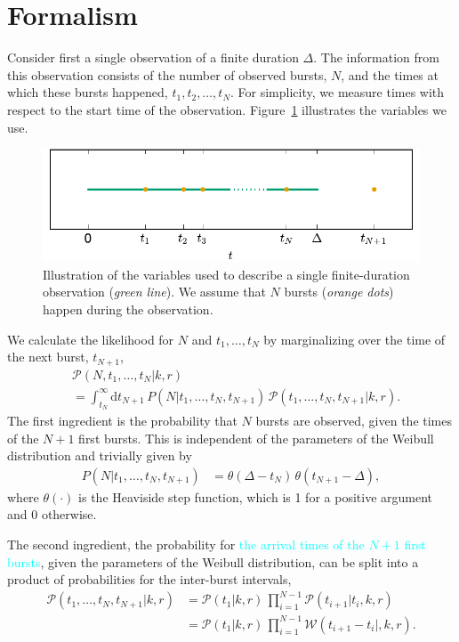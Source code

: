 \documentclass[fleqn,usenatbib]{mnras}
\newcommand{\new}[1]{\textcolor{cyan}{#1}}
\begin{document}
\section{Formalism}
\label{sec:formalism}

Consider first a single observation of a finite duration $\Delta$. The information from this observation consists of the number of observed bursts, $N$, and the times at which these bursts happened, $t_1, t_2,\dots, t_N$. For simplicity, we measure times with respect to the start time of the observation. Figure~\ref{fig:singleinterval} illustrates the variables we use.

\begin{figure}
	\includegraphics[width=\columnwidth]{singleinterval.pdf}
	\caption{\label{fig:singleinterval}Illustration of the variables used to describe a single finite-duration observation (\emph{green line}). We assume that $N$ bursts (\emph{orange dots}) happen during the observation.}
\end{figure}

We calculate the likelihood for $N$ and $t_1,\dots,t_N$ by marginalizing over the time of the next burst, $t_{N+1}$,
\begin{align}
	\label{eq:likelihood_firstsplit}
	&\mathcal{P}(N,t_1,\dots,t_N|k,r)\nonumber\\
	&= \int_{t_N}^\infty \mathrm{d}t_{N+1} \, P(N|t_1,\dots,t_N,t_{N+1}) \, \mathcal{P}(t_1,\dots,t_N,t_{N+1}|k,r).
\end{align}
The first ingredient is the probability that $N$ bursts are observed, given the times of the $N+1$ first bursts. This is independent of the parameters of the Weibull distribution and trivially given by
\begin{align}
	P(N|t_1,\dots,t_N,t_{N+1}) &= \theta(\Delta - t_N) \, \theta(t_{N+1} - \Delta),
\end{align}
where $\theta(\cdot)$ is the Heaviside step function, which is 1 for a positive argument and 0 otherwise.

The second ingredient, the probability for \new{the arrival times of the $N+1$ first bursts}, given the parameters of the Weibull distribution, can be split into a product of probabilities for the inter-burst intervals,
\begin{align}
	\label{eq:likelihood_times}
	\mathcal{P}(t_1,\dots,t_N,t_{N+1}|k,r) & = \mathcal{P}(t_1|k,r) \, \prod_{i = 1}^{N - 1} \mathcal{P}(t_{i+1}|t_{i},k,r)\nonumber\\
	&= \mathcal{P}(t_1|k,r) \, \prod_{i = 1}^{N - 1} \mathcal{W}(t_{i+1} - t_i|,k,r).
\end{align}
\end{document}
